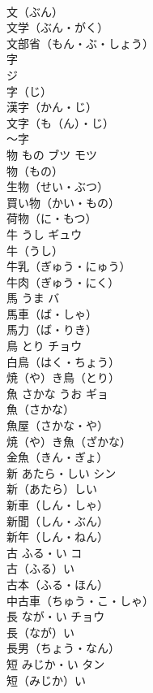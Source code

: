 \documentclass[8pt]{extreport}
\begin{document}
\begin{CJK}{UTF8}{min}
\\	文（ぶん）　
\\	文学（ぶん・がく）　
\\	文部省（もん・ぶ・しょう）　
\\	字	
\\	ジ	
\\	字（じ）　
\\	漢字（かん・じ）　
\\	文字（も（ん）・じ）　
\\	～字　
\\	物	もの	ブツ モツ	
\\	物（もの）　
\\	生物（せい・ぶつ）　
\\	買い物（かい・もの）　
\\	荷物（に・もつ）　
\\	牛	うし	ギュウ	
\\	牛（うし）　
\\	牛乳（ぎゅう・にゅう）　
\\	牛肉（ぎゅう・にく）　
\\	馬	うま	バ	
\\	馬車（ば・しゃ）　
\\	馬力（ば・りき）　
\\	鳥	とり	チョウ	
\\	白鳥（はく・ちょう） 
\\	焼（や）き鳥（とり） 
\\	魚	さかな うお	ギョ	
\\	魚（さかな）　
\\	魚屋（さかな・や）　
\\	焼（や）き魚（ざかな）　
\\	金魚（きん・ぎょ）　
\\	新	あたら・しい	シン	
\\	新（あたら）しい　
\\	新車（しん・しゃ）　
\\	新聞（しん・ぶん）　
\\	新年（しん・ねん）　
\\	古	ふる・い	コ	
\\	古（ふる）い　
\\	古本（ふる・ほん）　
\\	中古車（ちゅう・こ・しゃ）　
\\	長	なが・い	チョウ	
\\	長（なが）い　
\\	長男（ちょう・なん）　
\\	短	みじか・い	タン	
\\	短（みじか）い　

\end{CJK}
\end{document}
